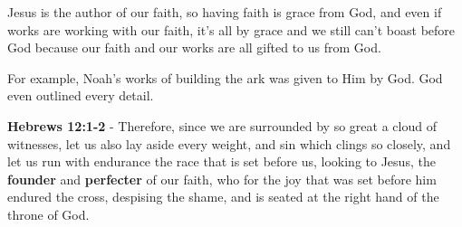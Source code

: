 \documentclass[11pt]{article}
\begin{document}
Jesus is the author of our faith, so having faith is grace from God, and even if works are working with our faith, it's all by grace and we still can't boast before God because our faith and our works are all gifted to us from God.

For example, Noah's works of building the ark was given to Him by God. God even outlined every detail.

\textbf{Hebrews 12:1-2} - Therefore, since we are surrounded by so great a cloud of witnesses, let us also lay aside every weight, and sin which clings so closely, and let us run with endurance the race that is set before us, looking to Jesus, the \textbf{founder} and \textbf{perfecter} of our faith, who for the joy that was set before him endured the cross, despising the shame, and is seated at the right hand of the throne of God.
\end{document}
